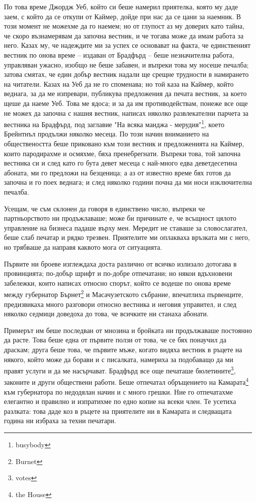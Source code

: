 \documentclass[12pt]{book}
\begin{document}
По това време Джордж Уеб, който си беше намерил приятелка, която му даде заем, с който да се откупи от Каймер, дойде при нас да се цани за наемник. В този момент не можехме да го наемем; но от глупост аз му доверих като тайна, че скоро възнамерявам да започна вестник, и че тогава може да имам работа за него. Казах му, че надеждите ми за успех се основават на факта, че единственият вестник по онова време – издаван от Брадфърд – беше незначителна работа, управляван ужасно, изобщо не беше забавен, и въпреки това му носеше печалба; затова смятах, че един добър вестник надали ще срещне трудности в намирането на читатели. Казах на Уеб да не го споменава; но той каза на Каймер, който веднага, за да ме изпревари, публикува предложения да печата вестник, за което щеше да наеме Уеб. Това ме ядоса; и за да им противодействам, понеже все още не можех да започна с нашия вестник, написах няколко развлекателни парчета за вестника на Брадфърд, под заглавие "На всяка манджа - мерудия"\footnote{busybody}, което Брейнтнъл продължи няколко месеца. По този начин вниманието на обществеността беше приковано към този вестник и предложенията на Каймер, които пародирахме и осмяхме, бяха пренебрегнати. Въпреки това, той започна вестника си и след като го бута девет месеца с най-много едва деветдесетина абоната, ми го предложи на безценица; а аз от известно време бях готов да започна и го поех веднага; и след няколко години почна да ми носи изключителна печалба. 

Усещам, че съм склонен да говоря в единствено число, въпреки че партньорството ни продъжлаваше; може би причинате е, че всъщност цялото управление на бизнеса падаше върху мен. Мередит не ставаше за словослагател, беше слаб печатар и рядко трезвен. Приятелите ми оплакваха връзката ми с него, но трябваше да направя каквото мога от ситуацията.

Първите ни броеве изглеждаха доста различно от всичко излизало дотогава в провинцията; по-добър шрифт и по-добре отпечатани; но някои вдъхновени забележки, които написах относно спорът, който се водеше по онова време между губернатор Бърнет\footnote{Burnet} и Масачузетското събрание, впечатлиха първенците, предизвикаха много разговори относно вестника и неговия управител, и след няколко седмици доведоха до това, че всичките ни станаха абонати.

Примерът им беше последван от мнозина и бройката ни продължаваше постоянно да расте. Това беше една от първите ползи от това, че се бях понаучил да драскам; друга беше това, че първите мъже, когато видяха вестник в ръцете на някого, който може да борави и с писалката, намериха за подобаващо да ми правят услуги и да ме насърчават. Брадфърд все още печаташе бюлетините\footnote{votes}, законите и други обществени работи. Беше отпечатал обръщението на Камарата\footnote{the House} към губернатора по недодялан начин и с много грешки. Ние го отпечатахме елегантно и правилно и изпратихме по едно копие на всеки член. Те усетиха разлката: това даде коз в ръцете на приятелите ни в Камарата и следващата година ни избраха за техни печатари.
\end{document}
